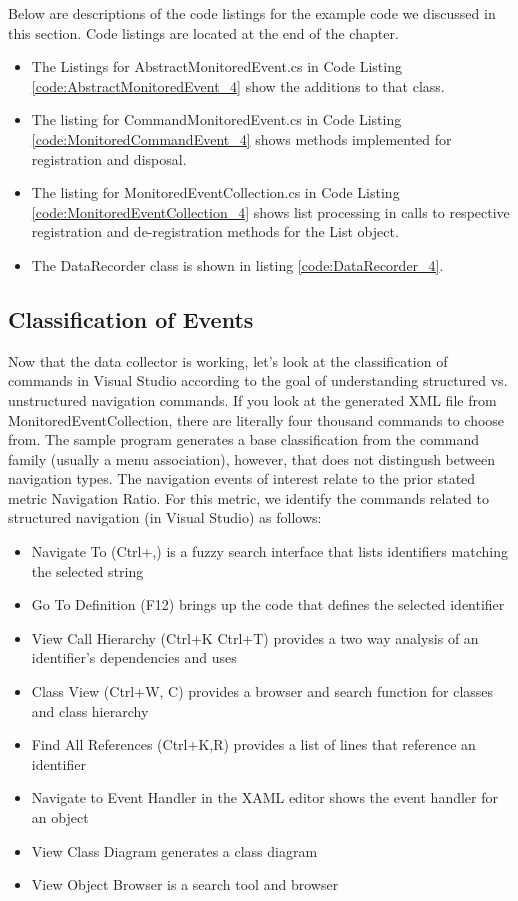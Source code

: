 Below are descriptions of the code listings for the example code we discussed in this section.  Code listings are located at the end of the chapter.
\begin{itemize}
\item
The Listings for AbstractMonitoredEvent.cs in Code Listing \ref{code:AbstractMonitoredEvent_4}  show the additions to that class.  
\item
The listing for CommandMonitoredEvent.cs in Code Listing \ref{code:MonitoredCommandEvent_4} shows methods implemented for registration and disposal.
\item
The listing for MonitoredEventCollection.cs in Code Listing \ref{code:MonitoredEventCollection_4} shows list processing in calls to respective registration and de-registration methods for the List object.
\item
The DataRecorder class is shown in listing \ref{code:DataRecorder_4}.
\end{itemize}



\subsection{Classification of Events}
Now that the data collector is working, let's look at the classification of commands in Visual Studio according to the goal of understanding structured vs. unstructured navigation commands.  If you look at the generated XML file from MonitoredEventCollection, there are literally four thousand commands to choose from.  The sample program generates a base classification from the command family (usually a menu association), however, that does not distingush between navigation types.    The navigation events of interest relate to the prior stated metric Navigation Ratio.  For this metric,  we identify the  commands related to structured navigation (in Visual Studio) as follows:
\begin{itemize}
\item
 Navigate To (Ctrl+,) is a fuzzy search interface that lists identifiers matching the selected string
\item Go To Definition (F12) brings up the code that defines the selected identifier
\item View Call Hierarchy (Ctrl+K Ctrl+T) provides a two way analysis of an identifier's dependencies and uses
\item Class View (Ctrl+W, C) provides a browser and search function for classes and class hierarchy
\item Find All References (Ctrl+K,R) provides a list of lines that reference an identifier
\item Navigate to Event Handler in the XAML editor shows the event handler for an object
\item View Class Diagram generates a class diagram
\item View Object Browser is a search tool and browser
\end{itemize}

